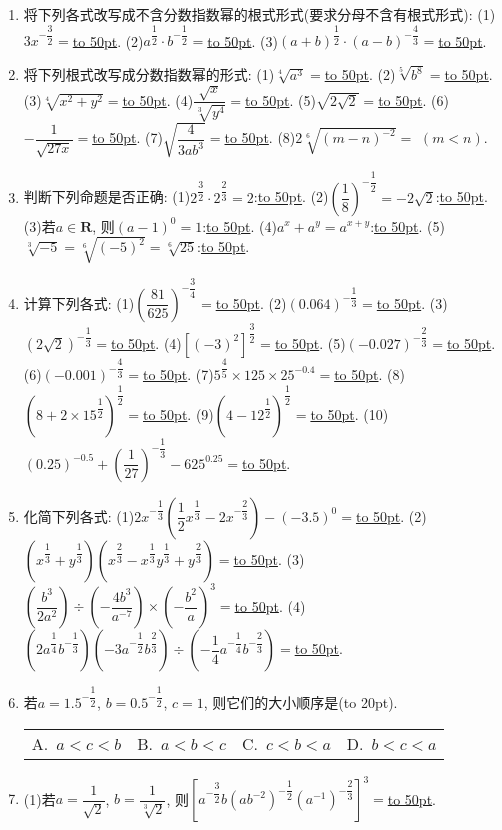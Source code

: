 \documentclass[10pt,a4paper]{article}
\newcommand{\blank}[1]{\underline{\hbox to #1pt{}}}
\newcommand{\bracket}[1]{(\hbox to #1pt{})}
\newcommand{\fourch}[4]{\par\begin{tabular}{p{.23\textwidth}p{.23\textwidth}p{.23\textwidth}p{.23\textwidth}}
A.~#1 &B.~#2& C.~#3& D.~#4
\end{tabular}}
\begin{document}
\begin{enumerate}[1.]
    (7)$\dfrac 1{1+\sqrt 2+\sqrt 3}+\dfrac 1{1-\sqrt 2+\sqrt 3}=$\blank{50}.
    \item 将下列各式改写成不含分数指数幂的根式形式(要求分母不含有根式形式):
    (1)$3{x^{-\dfrac 32}}=$\blank{50}.				(2)${a^{\dfrac 12}}\cdot {b^{-\dfrac 12}}=$\blank{50}.
    (3)${{(a+b)}^{\dfrac 12}}\cdot {{(a-b)}^{-\dfrac 43}}=$\blank{50}.
    \item 将下列根式改写成分数指数幂的形式:
    (1)$\sqrt[4]{a^3}=$\blank{50}.			(2)$\sqrt[5]{b^8}=$\blank{50}.
    (3)$\sqrt[4]{{x^2}+{y^2}}=$\blank{50}.		(4)$\dfrac{\sqrt x}{\sqrt[3]{y^4}}=$\blank{50}.
    (5)$\sqrt{2\sqrt 2}=$\blank{50}.			(6)$-\dfrac 1{\sqrt{27x}}=$\blank{50}.
    (7)$\sqrt{\dfrac 4{3a{b^3}}}=$\blank{50}.			(8)$2\sqrt[6]{(m-n)^{-2}}=$    $(m<n)$.
    \item 判断下列命题是否正确:
    (1)${2^{\dfrac 32}}\cdot {2^{\dfrac 23}}=2$:\blank{50}.
    (2)${{(\dfrac 18)}^{-\dfrac 12}}=-2\sqrt 2$:\blank{50}.
    (3)若$a\in \mathbf{R}$, 则$(a-1)^0=1$:\blank{50}.
    (4)$a^x+a^y={a^{x+y}}$:\blank{50}.
    (5)$\sqrt[3]{-5}=\sqrt[6]{(-5)^2}=\sqrt[6]{25}$:\blank{50}.
    \item 计算下列各式:
    (1)${{(\dfrac{81}{625})}^{-\dfrac 34}}=$\blank{50}.
    (2)${{(0.064)}^{-\dfrac 13}}=$\blank{50}.
    (3)${{(2\sqrt 2)}^{-\dfrac 13}}=$\blank{50}.
    (4)${{[ (-3)^2 ]}^{\dfrac 32}}=$\blank{50}.
    (5)${{(-0.027)}^{-\dfrac 23}}=$\blank{50}.
    (6)${{(-0.001)}^{-\dfrac 43}}=$\blank{50}.
    (7)${5^{\dfrac 45}}\times 125\times {{25}^{-0.4}}=$\blank{50}.
    (8)${{(8+2\times {{15}^{\dfrac 12}})}^{\dfrac 12}}=$\blank{50}.
    (9)${{(4-{{12}^{\dfrac 12}})}^{\dfrac 12}}=$\blank{50}.
    (10)${{(0.25)}^{-0.5}}+{{(\dfrac 1{27})}^{-\dfrac 13}}-{{625}^{0.25}}=$\blank{50}.
    \item 化简下列各式:
    (1)$2{x^{-\dfrac 13}}(\dfrac 12{x^{\dfrac 13}}-2{x^{-\dfrac 23}})-(-3.5)^0=$\blank{50}.
    (2)$({x^{\dfrac 13}}+{y^{\dfrac 13}})({x^{\dfrac 23}}-{x^{\dfrac 13}}{y^{\dfrac 13}}+{y^{\dfrac 23}})=$\blank{50}.
    (3)$(\dfrac{b^3}{2{a^2}})\div (-\dfrac{4{b^3}}{{a^{-7}}})\times (-\dfrac{b^2}a)^3=$\blank{50}.
    (4)$(2{a^{\dfrac 14}}{b^{-\dfrac 13}})(-3{a^{-\dfrac 12}}{b^{\dfrac 23}})\div (-\dfrac 14{a^{-\dfrac 14}}{b^{-\dfrac 23}})=$\blank{50}.
    \item 若$a={{1.5}^{-\dfrac 12}}$, $b={{0.5}^{-\dfrac 12}}$, $c=1$, 则它们的大小顺序是\bracket{20}.
    \fourch{$a<c<b$}{$a<b<c$}{$c<b<a$}{$b<c<a$}
    \item (1)若$a=\dfrac 1{\sqrt 2}$, $b=\dfrac 1{\sqrt[3]2}$, 则${{[ {a^{-\dfrac 32}}b{{(a{b^{-2}})}^{-\dfrac 12}}{{({a^{-1}})}^{-\dfrac 23}} ]}^3}=$\blank{50}.

\end{enumerate}
\end{document}
